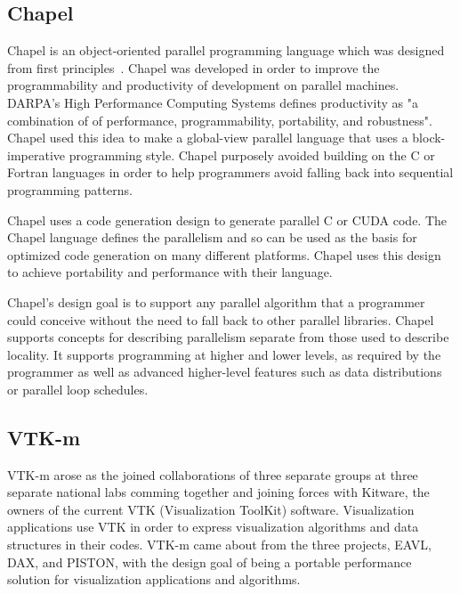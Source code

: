 \subsection*{\textbf{Chapel}}

Chapel is an object-oriented parallel programming language which was designed from first principles~\cite{sidelnik2012performance}.
%
Chapel was developed in order to improve the programmability and productivity of development on parallel machines.
%
DARPA's High Performance Computing Systems defines productivity as "a combination of of performance, programmability, portability, and robustness".
~\cite{chamberlain2007parallel}
%
Chapel used this idea to make a global-view parallel language that uses a block-imperative programming style.
%
Chapel purposely avoided building on the C or Fortran languages in order to help programmers avoid falling back into sequential programming patterns.
%
\cite{chamberlain2007parallel}

Chapel uses a code generation design to generate parallel C or CUDA code.
%
The Chapel language defines the parallelism and so can be used as the basis for optimized code generation on many different platforms.
%
Chapel uses this design to achieve portability and performance with their language.

Chapel's design goal is to support any parallel algorithm that a programmer could conceive without the need to fall back to other parallel libraries.
%
Chapel supports concepts for describing parallelism separate from those used to describe locality.
%
It supports programming at higher and lower levels, as required by the programmer as well as advanced higher-level features such as data distributions or parallel loop schedules.
%
~\cite{bradchamberlain2013}


\subsection*{\textbf{VTK-m}}

VTK-m arose as the joined collaborations of three separate groups at three separate national labs comming together and joining forces with Kitware, the owners of the current VTK (Visualization ToolKit) software.
%
Visualization applications use VTK in order to express visualization algorithms and data structures in their codes.
%
VTK-m came about from the three projects, EAVL, DAX, and PISTON, with the design goal of being a portable performance solution for visualization applications and algorithms.
%

